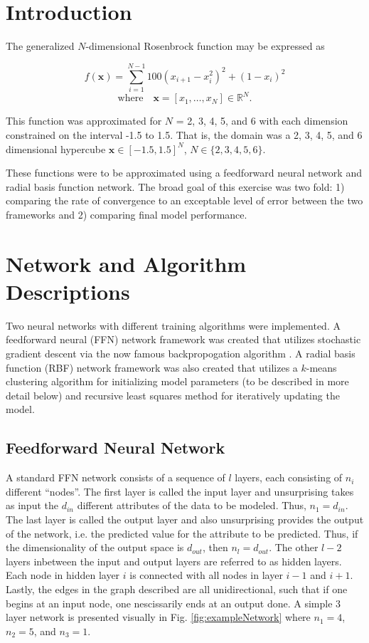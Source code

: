 \documentclass[conference]{IEEEtran}
\begin{document}
\section{Introduction}
\label{intro}
The generalized $N$-dimensional Rosenbrock function may be expressed as

$$
f(\mathbf{x}) = \sum_{i=1}^{N-1} 100 (x_{i+1} - x_i^2 )^2 + (1-x_i)^2
$$$$
  \mbox{where} \quad \mathbf{x} = [x_1, \ldots, x_N] \in \mathbb{R}^N.
$$

This function was approximated for $N$ = 2, 3, 4, 5, and 6 with each dimension constrained on the interval -1.5 to 1.5. That is, the domain was a 2, 3, 4, 5, and 6 dimensional hypercube $ \mathbf{x} \in [-1.5, 1.5]^N$, $N \in \{2,3,4,5,6\}$.

These functions were to be approximated using a feedforward neural network and radial basis function network. The broad goal of this exercise was two fold: 1) comparing the rate of convergence to an exceptable level of error between the two frameworks and 2) comparing final model performance.
  
\section{Network and Algorithm Descriptions}
Two neural networks with different training algorithms were implemented. A feedforward neural (FFN) network framework was created that utilizes stochastic gradient descent via the now famous backpropogation algorithm \cite{rumelhart}. A radial basis function (RBF) network framework was also created that utilizes a $k$-means clustering algorithm for initializing model parameters (to be described in more detail below) and recursive least squares method for iteratively updating the model.

  \subsection{Feedforward Neural Network}
  A standard FFN network consists of a sequence of $l$ layers, each consisting of $n_i$ different ``nodes''. The first layer is called the input layer and unsurprising takes as input the $d_{in}$ different attributes of the data to be modeled. Thus, $n_1 = d_{in}$. The last layer is called the output layer and also unsurprising provides the output of the network, i.e. the predicted value for the attribute to be predicted. Thus, if the dimensionality of the output space is $d_{out}$, then $n_l = d_{out}$. The other $l-2$ layers inbetween the input and output layers are referred to as hidden layers. Each node in hidden layer $i$ is connected with all nodes in layer $i-1$ and $i+1$. Lastly, the edges in the graph described are all unidirectional, such that if one begins at an input node, one nescissarily ends at an output done. A simple 3 layer network is presented visually in Fig. \ref{fig:exampleNetwork} where $n_1 = 4$, $n_2 = 5$, and $n_3 = 1$.
\end{document}
